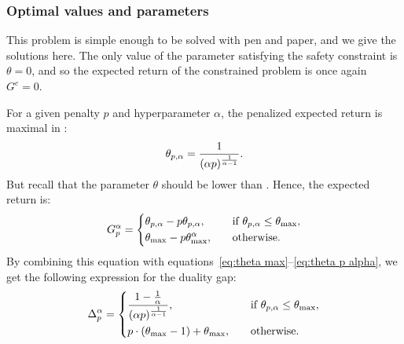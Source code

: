 \subsubsection{Optimal values and parameters}
This problem is simple enough to be solved with pen and paper, and we give the solutions here. The only value of the parameter satisfying the safety constraint is $\theta = 0$, and so the expected return of the constrained problem is once again $G^c = 0$.\par
For a given penalty $p$ and hyperparameter $\alpha$, the penalized expected return is maximal in :
\begin{equation}
	\theta_{p, \alpha} = \frac{1}{(\alpha p)^\frac{1}{\alpha - 1}}.\label{eq:theta p alpha}
\end{equation}
But recall that the parameter $\theta$ should be lower than \thetamax. Hence, the expected return is:
\begin{equation*}
	G_p^\alpha = \begin{dcases}
		\theta_{p, \alpha} - p \theta_{p, \alpha},&\quad\text{if}~\theta_{p, \alpha}\leq\theta_\text{max},\\
		\theta_\text{max} - p \theta_\text{max}^\alpha,&\quad\text{otherwise}.
	\end{dcases}
\end{equation*}
By combining this equation with equations~\eqref{eq:theta max}--\eqref{eq:theta p alpha}, we get the following expression for the duality gap:
\begin{equation}
	\Delta_p^\alpha = \begin{dcases}
	\frac{1 - \frac{1}{\alpha}}{(\alpha p)^\frac{1}{\alpha - 1}}, &\quad\text{if}~\theta_{p, \alpha}\leq\theta_\text{max},\\
	p\cdot(\theta_\text{max} - 1) + \theta_\text{max},&\quad\text{otherwise}.
	\end{dcases} \label{eq:duality gap}
\end{equation}

